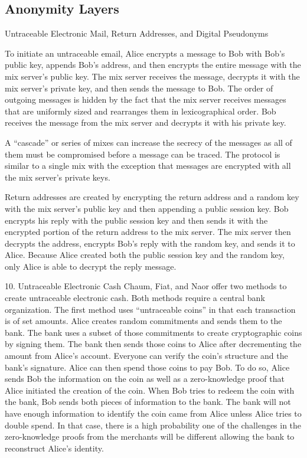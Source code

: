 \subsection{Anonymity Layers}

Untraceable Electronic Mail, Return Addresses, and Digital Pseudonyms

To initiate an untraceable email, Alice encrypts a message to Bob with Bob’s public key, appends Bob’s address, and then encrypts the entire message with the mix server’s public key.  The mix server receives the message, decrypts it with the mix server’s private key, and then sends the message to Bob.  The order of outgoing messages is hidden by the fact that the mix server receives messages that are uniformly sized and rearranges them in lexicographical order.  Bob receives the message from the mix server and decrypts it with his private key.

A “cascade” or series of mixes can increase the secrecy of the messages as all of them must be compromised before a message can be traced.  The protocol is similar to a single mix with the exception that messages are encrypted with all the mix server’s private keys.

Return addresses are created by encrypting the return address and a random key with the mix server’s public key and then appending a public session key.  Bob encrypts his reply with the public session key and then sends it with the encrypted portion of the return address to the mix server.  The mix server then decrypts the address, encrypts Bob’s reply with the random key, and sends it to Alice.  Because Alice created both the public session key and the random key, only Alice is able to decrypt the reply message.

10. Untraceable Electronic Cash
Chaum, Fiat, and Naor offer two methods to create untraceable electronic cash.  Both methods require a central bank organization.  The first method uses “untraceable coins” in that each transaction is of set amounts.  Alice creates random commitments and sends them to the bank.  The bank uses a subset of those commitments to create cryptographic coins by signing them.  The bank then sends those coins to Alice after decrementing the amount from Alice’s account.  Everyone can verify the coin’s structure and the bank’s signature. Alice can then spend those coins to pay Bob.  To do so, Alice sends Bob the information on the coin as well as a zero-knowledge proof that Alice initiated the creation of the coin.  When Bob tries to redeem the coin with the bank, Bob sends both pieces of information to the bank.  The bank will not have enough information to identify the coin came from Alice unless Alice tries to double spend.  In that case, there is a high probability one of the challenges in the zero-knowledge proofs from the merchants will be different allowing the bank to reconstruct Alice’s identity.

